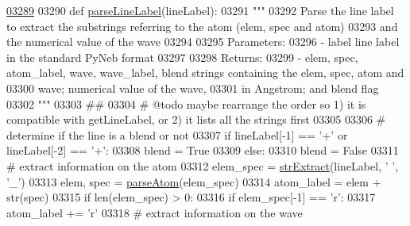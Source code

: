 \begin{DoxyCode}
\hypertarget{namespacepyneb_1_1core_1_1pynebcore_l03289}{}\hyperlink{namespacepyneb_1_1core_1_1pynebcore_a15b88e2a4daeae68052060cb425c7a1c}{03289} 
03290 \textcolor{keyword}{def }\hyperlink{namespacepyneb_1_1core_1_1pynebcore_a15b88e2a4daeae68052060cb425c7a1c}{parseLineLabel}(lineLabel):
03291     \textcolor{stringliteral}{"""}
03292 \textcolor{stringliteral}{    Parse the line label to extract the substrings referring to the atom (elem, spec and atom)}
03293 \textcolor{stringliteral}{    and the numerical value of the wave}
03294 \textcolor{stringliteral}{    }
03295 \textcolor{stringliteral}{    Parameters:}
03296 \textcolor{stringliteral}{        - label    line label in the standard PyNeb format}
03297 \textcolor{stringliteral}{    }
03298 \textcolor{stringliteral}{    Returns:}
03299 \textcolor{stringliteral}{        - elem, spec, atom\_label, wave, wave\_label, blend  strings containing the elem, spec, atom and }
03300 \textcolor{stringliteral}{                                                              wave; numerical value of the wave, }
03301 \textcolor{stringliteral}{                                                              in Angstrom; and blend flag }
03302 \textcolor{stringliteral}{    """}
03303     \textcolor{comment}{##}
03304     \textcolor{comment}{# @todo maybe rearrange the order so 1) it is compatible with getLineLabel, or 2) it lists all the
       strings first }
03305 
03306     \textcolor{comment}{# determine if the line is a blend or not}
03307     \textcolor{keywordflow}{if} lineLabel[-1] == \textcolor{stringliteral}{'+'}  \textcolor{keywordflow}{or} lineLabel[-2] == \textcolor{stringliteral}{'+'}:
03308         blend = \textcolor{keyword}{True}
03309     \textcolor{keywordflow}{else}:
03310         blend = \textcolor{keyword}{False}
03311     \textcolor{comment}{# extract information on the atom}
03312     elem\_spec = \hyperlink{namespacepyneb_1_1utils_1_1misc_aaf9c5249e3c3104e38854ca30f9df4b7}{strExtract}(lineLabel, \textcolor{stringliteral}{' '}, \textcolor{stringliteral}{'\_'})
03313     elem, spec = \hyperlink{namespacepyneb_1_1utils_1_1misc_a2bb6f906a75f26a882093e9ce9272507}{parseAtom}(elem\_spec)
03314     atom\_label = elem + str(spec)
03315     \textcolor{keywordflow}{if} len(elem\_spec) > 0:
03316         \textcolor{keywordflow}{if} elem\_spec[-1] == \textcolor{stringliteral}{'}\textcolor{stringliteral}{r':}
03317 \textcolor{stringliteral}{            atom\_label += }\textcolor{stringliteral}{'}\textcolor{stringliteral}{r'}
03318 \textcolor{stringliteral}{    }\textcolor{comment}{# extract information on the wave}

\end{DoxyCode}
